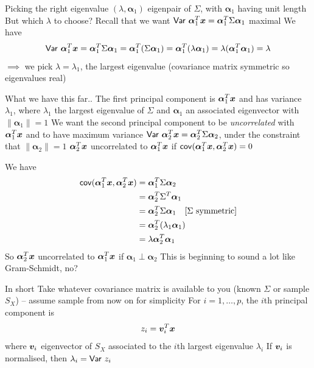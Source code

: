 \documentclass[aspectratio=169]{beamer}\usepackage[]{graphicx}\usepackage[]{xcolor}
\begin{document}
\begin{frame}{Picking the right eigenvalue}
$(\lambda,\bm{\alpha}_1)$ eigenpair of $\Sigma$, with $\bm{\alpha}_1$ having unit length
\vfill
But which $\lambda$ to choose?
\vfill
Recall that we want $\mathsf{Var}\  \bm{\alpha}_1^T\bm{x}=\bm{\alpha}_1^T\Sigma\bm{\alpha}_1$ maximal
\vfill
We have
\[
\mathsf{Var}\  \bm{\alpha}_1^T\bm{x} 
= \bm{\alpha}_1^T\Sigma\bm{\alpha}_1 
= \bm{\alpha}_1^T(\Sigma\bm{\alpha}_1) 
= \bm{\alpha}_1^T(\lambda\bm{\alpha}_1) 
= \lambda(\bm{\alpha}_1^T\bm{\alpha}_1) = \lambda
\]
\vfill
$\implies$ we pick $\lambda=\lambda_1$, the largest eigenvalue (covariance matrix symmetric so eigenvalues real)
\end{frame}


\begin{frame}{What we have this far..}
The first principal component is $\bm{\alpha}_1^T\bm{x}$ and has variance $\lambda_1$, where $\lambda_1$ the largest eigenvalue of $\Sigma$ and $\bm{\alpha}_1$ an associated eigenvector with $\|\bm{\alpha}_1\|=1$
\vfill
We want the second principal component to be \emph{uncorrelated} with $\bm{\alpha}_1^T\bm{x}$ and to have maximum variance $\mathsf{Var}\  \bm{\alpha}_2^T\bm{x}=\bm{\alpha}_2^T\Sigma\bm{\alpha}_2$, under the constraint that $\|\bm{\alpha}_2\|=1$
\vfill
$\bm{\alpha}_2^T\bm{x}$ uncorrelated to $\bm{\alpha}_1^T\bm{x}$ if $\mathsf{cov}(\bm{\alpha}_1^T\bm{x},\bm{\alpha}_2^T\bm{x})=0$
\end{frame}

\begin{frame}
We have
\begin{align*}
\mathsf{cov}(\bm{\alpha}_1^T\bm{x},\bm{\alpha}_2^T\bm{x}) &= 
\bm{\alpha}_1^T\Sigma\bm{\alpha}_2 \\
&= \bm{\alpha}_2^T\Sigma^T\bm{\alpha}_1 \\
&= \bm{\alpha}_2^T\Sigma\bm{\alpha}_1 \quad\textrm{[$\Sigma$ symmetric]} \\
&= \bm{\alpha}_2^T(\lambda_1\bm{\alpha}_1) \\
&= \lambda \bm{\alpha}_2^T\bm{\alpha}_1
\end{align*}
\vfill
So $\bm{\alpha}_2^T\bm{x}$ uncorrelated to $\bm{\alpha}_1^T\bm{x}$ if $\bm{\alpha}_1\perp\bm{\alpha}_2$
\vfill
This is beginning to sound a lot like Gram-Schmidt, no?
\end{frame}

\begin{frame}{In short}
Take whatever covariance matrix is available to you (known $\Sigma$ or sample $S_X$) -- assume sample from now on for simplicity
\vfill
For $i=1,\ldots,p$, the $i$th principal component is
\[
z_i = \bm{v}_i^T\bm{x}
\]
where $\bm{v}_i$ eigenvector of $S_X$ associated to the $i$th largest eigenvalue $\lambda_i$
\vfill
If $\bm{v}_i$ is normalised, then $\lambda_i=\mathsf{Var}\  z_i$
\end{frame}
\end{document}
